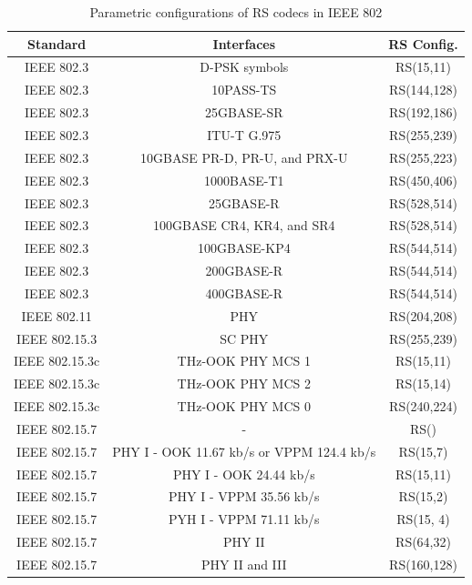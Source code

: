 \documentclass[conference]{IEEEtran}
\begin{document}
\begin{table}[!hbt]
\captionsetup{justification=centering, labelsep=newline}
\centering
\label{tab:t2}
\caption{Parametric configurations of RS codecs in IEEE 802} 
\begin{tabular}{ccc}
\toprule
Standard  & Interfaces & RS Config.                                                                                                    \\
\midrule
IEEE 802.3 & D-PSK symbols & RS(15,11)
\\
IEEE 802.3 & 10PASS-TS & RS(144,128)
\\
IEEE 802.3 & 25GBASE-SR & RS(192,186)
\\
IEEE 802.3 & ITU-T G.975 & RS(255,239)
\\
IEEE 802.3 & 10GBASE PR-D, PR-U, and PRX-U & RS(255,223)
\\
IEEE 802.3 & 1000BASE-T1 & RS(450,406)
\\
IEEE 802.3 & 25GBASE-R & RS(528,514)
\\
IEEE 802.3 & 100GBASE CR4, KR4, and SR4 & RS(528,514)
\\
IEEE 802.3 & 100GBASE-KP4 & RS(544,514)
\\
IEEE 802.3 & 200GBASE-R & RS(544,514)
\\
IEEE 802.3 & 400GBASE-R & RS(544,514)
\\
IEEE 802.11 & PHY & RS(204,208)
\\
IEEE 802.15.3 & SC PHY & RS(255,239)
\\
IEEE 802.15.3c & THz-OOK PHY MCS 1 & RS(15,11)
\\
IEEE 802.15.3c & THz-OOK PHY MCS 2 & RS(15,14)
\\
IEEE 802.15.3c & THz-OOK PHY MCS 0 & RS(240,224)
\\
IEEE 802.15.7 & - & RS()
\\
IEEE 802.15.7 & PHY I - OOK 11.67 kb/s or VPPM 124.4 kb/s & RS(15,7)
\\
IEEE 802.15.7 & PHY I - OOK 24.44 kb/s & RS(15,11)
\\
IEEE 802.15.7 & PHY I - VPPM 35.56 kb/s & RS(15,2)
\\
IEEE 802.15.7 & PYH I - VPPM 71.11 kb/s & RS(15, 4)
\\
IEEE 802.15.7 & PHY II & RS(64,32)
\\
IEEE 802.15.7 & PHY II and III & RS(160,128)
\\
\bottomrule
\end{tabular}
\end{table}
\end{document}

